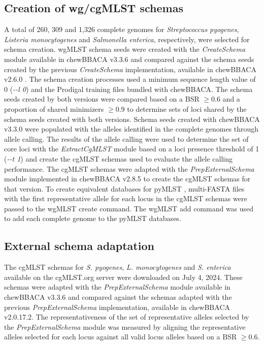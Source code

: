 \subsection{Creation of wg/cgMLST schemas} \label{ssec:methods_ssec3}

A total of 260, 309 and 1,326 complete genomes for \textit{Streptococcus pyogenes}, \textit{Listeria monocytogenes} and \textit{Salmonella enterica}, respectively, were selected for schema creation. \ac{wgMLST} schema seeds were created with the \textit{CreateSchema} module available in chewBBACA v3.3.6 and compared against the schema seeds created by the previous \textit{CreateSchema} implementation, available in chewBBACA v2.6.0 \citep{silva_chewbbaca_2018}. The schema creation processes used a minimum sequence length value of 0 (\textit{-{}-l 0}) and the Prodigal \citep{hyatt_prodigal_2010} training files bundled with chewBBACA. The schema seeds created by both versions were compared based on a \ac{BSR} $\geq0.6$ and a proportion of shared minimizers $\geq0.9$ to determine sets of loci shared by the schema seeds created with both versions. Schema seeds created with chewBBACA v3.3.0 were populated with the alleles identified in the complete genomes through allele calling. The results of the allele calling were used to determine the set of core loci with the \textit{ExtractCgMLST} module based on a loci presence threshold of 1 (\textit{-{}-t 1}) and create the \ac{cgMLST} schemas used to evaluate the allele calling performance. The \ac{cgMLST} schemas were adapted with the \textit{PrepExternalSchema} module implemented in chewBBACA v2.8.5 to create the \ac{cgMLST} schemas for that version. To create equivalent databases for pyMLST \citep{biguenet_introduction_2023}, multi-FASTA files with the first representative allele for each locus in the \ac{cgMLST} schemas were passed to the \ac{wgMLST} create command. The \ac{wgMLST} add command was used to add each complete genome to the pyMLST databases.

\subsection{External schema adaptation} \label{ssec:methods_ssec4}

The \ac{cgMLST} schemas for \textit{S. pyogenes}, \textit{L. monocytogenes} and \textit{S. enterica} available on the cgMLST.org server \citep{noauthor_cgmlstorg_nodate} were downloaded on July 4, 2024. These schemas were adapted with the \textit{PrepExternalSchema} module available in chewBBACA v3.3.6 and compared against the schemas adapted with the previous \textit{PrepExternalSchema} implementation, available in chewBBACA v2.0.17.2. The representativeness of the set of representative alleles selected by the \textit{PrepExternalSchema} module was measured by aligning the representative alleles selected for each locus against all valid locus alleles based on a \ac{BSR} $\geq0.6$.

